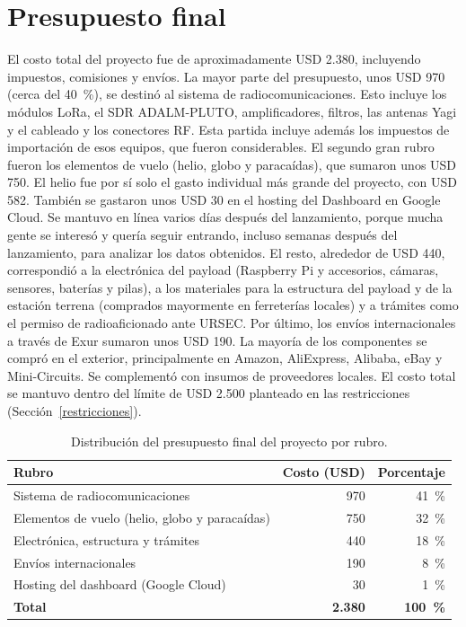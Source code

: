 \documentclass[12pt,a4paper]{article}
\begin{document}
\section{Presupuesto final}\label{presupuesto-final}

El costo total del proyecto fue de aproximadamente USD 2.380, incluyendo impuestos, comisiones y envíos. La mayor parte del presupuesto, unos USD 970 (cerca del 40~\%), se destinó al sistema de radiocomunicaciones. Esto incluye los módulos LoRa, el SDR ADALM-PLUTO, amplificadores, filtros, las antenas Yagi y el cableado y los conectores RF. Esta partida incluye además los impuestos de importación de esos equipos, que fueron considerables. El segundo gran rubro fueron los elementos de vuelo (helio, globo y paracaídas), que sumaron unos USD 750. El helio fue por sí solo el gasto individual más grande del proyecto, con USD 582. También se gastaron unos USD 30 en el hosting del Dashboard en Google Cloud. Se mantuvo en línea varios días después del lanzamiento, porque mucha gente se interesó y quería seguir entrando, incluso semanas después del lanzamiento, para analizar los datos obtenidos. El resto, alrededor de USD 440, correspondió a la electrónica del payload (Raspberry Pi y accesorios, cámaras, sensores, baterías y pilas), a los materiales para la estructura del payload y de la estación terrena (comprados mayormente en ferreterías locales) y a trámites como el permiso de radioaficionado ante URSEC. Por último, los envíos internacionales a través de Exur sumaron unos USD 190. La mayoría de los componentes se compró en el exterior, principalmente en Amazon, AliExpress, Alibaba, eBay y Mini-Circuits. Se complementó con insumos de proveedores locales. El costo total se mantuvo dentro del límite de USD 2.500 planteado en las restricciones (Sección~\ref{restricciones}).

\begin{table}[H]
\centering
\small
\renewcommand{\arraystretch}{1.3}
\begin{tabular}{@{}l r r@{}}
\toprule
\textbf{Rubro} & \textbf{Costo (USD)} & \textbf{Porcentaje} \\
\midrule
Sistema de radiocomunicaciones & 970 & 41~\% \\
Elementos de vuelo (helio, globo y paracaídas) & 750 & 32~\% \\
Electrónica, estructura y trámites & 440 & 18~\% \\
Envíos internacionales & 190 & 8~\% \\
Hosting del dashboard (Google Cloud) & 30 & 1~\% \\
\midrule
\textbf{Total} & \textbf{2.380} & \textbf{100~\%} \\
\bottomrule
\end{tabular}
\caption{Distribución del presupuesto final del proyecto por rubro.}
\label{tab:presupuesto-final}
\end{table}
\end{document}
